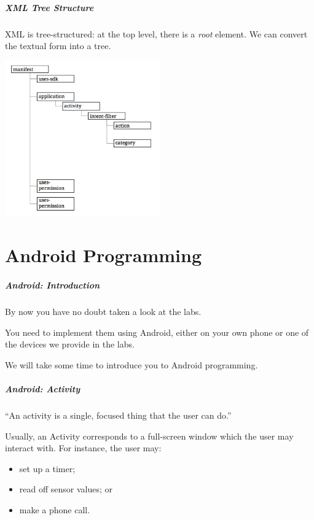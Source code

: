 \begin{frame}[fragile]
\frametitle{XML Tree Structure}
\begin{changemargin}{1cm}

XML is tree-structured: at the top level, there is a \emph{root} element. We can convert the textual form into a tree.

\begin{center}
\includegraphics[width=0.5\textwidth]{images/XML-Structure.png}
\end{center}

\end{changemargin}
\end{frame}

\part{Android Programming}
\frame{\partpage}

\begin{frame}
\frametitle{Android: Introduction}
\begin{changemargin}{1cm}

By now you have no doubt taken a look at the labs.

You need to implement them using Android, either on your own phone or one of the devices we provide in the labs. 

We will take some time to introduce you to Android programming.

\end{changemargin}
\end{frame}


\begin{frame}
\frametitle{Android: Activity}
\begin{changemargin}{1cm}

``An activity is a single, focused thing that the user can do.''

Usually, an Activity corresponds to a full-screen window which 
the user may interact with. For instance, the user may:
\begin{itemize}
\item set up a timer; 
\item read off sensor values; or
\item make a phone call.
\end{itemize}

\end{changemargin}
\end{frame}

